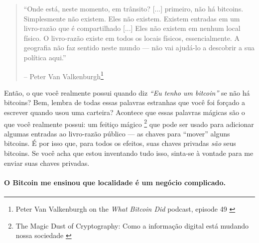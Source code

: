 \begin{quotation}\begin{samepage}
\enquote{Onde está, neste momento, em trânsito? [...] primeiro, não há bitcoins. Simplesmente não existem. Eles não existem. Existem entradas em um livro-razão que é compartilhado [...] Eles não existem em nenhum local físico. O livro-razão existe em todos os locais físicos, essencialmente. A geografia não faz sentido neste mundo --- não vai ajudá-lo a descobrir a sua política aqui.}
\begin{flushright} -- Peter Van Valkenburgh\footnote{Peter Van Valkenburgh on the \textit{What Bitcoin Did} podcast, episode 49 \cite{wbd049}}
\end{flushright}\end{samepage}\end{quotation}

Então, o que você realmente possui quando diz \textit{\enquote{Eu tenho um bitcoin}} se não há bitcoins? Bem, lembra de todas essas palavras estranhas que você foi forçado a escrever quando usou uma carteira? Acontece que essas palavras mágicas são o que você realmente possui: um feitiço mágico \footnote{The Magic Dust of Cryptography: Como a informação digital está mudando nossa sociedade \cite{gigi:magic-spell}} que pode ser usado para adicionar algumas entradas ao livro-razão público --- as chaves para \enquote{mover} alguns bitcoins. É por isso que, para todos os efeitos, suas chaves privadas \textit{são} seus bitcoins. Se você acha que estou inventando tudo isso, sinta-se à vontade para me enviar suas chaves privadas.

\paragraph{O Bitcoin me ensinou que localidade é um negócio complicado.}

%
%
%
%
%
%
%

